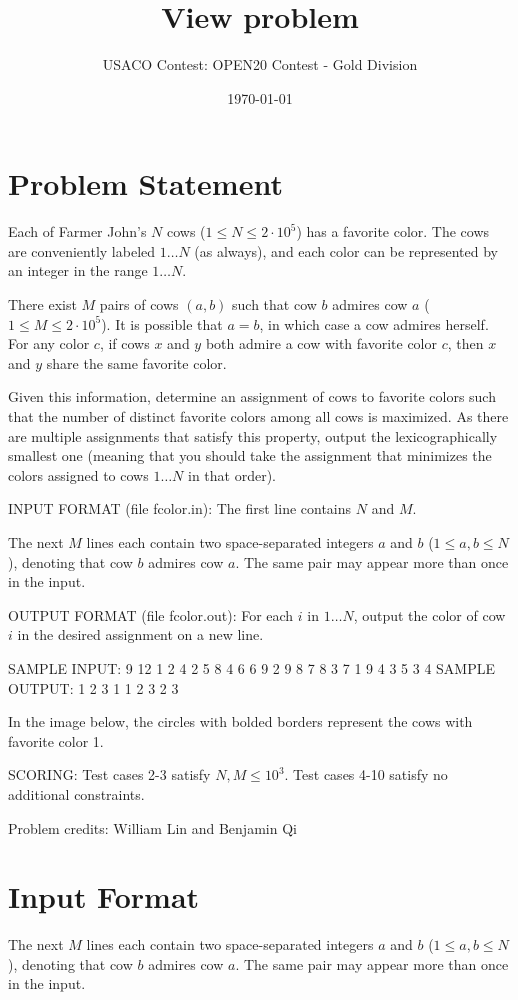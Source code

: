 \documentclass[12pt]{article}
\title{View problem}
\author{USACO Contest: OPEN20 Contest - Gold Division}
\date{\today}
\begin{document}
\maketitle

\section*{Problem Statement}

Each of Farmer John's $N$ cows ($1\le N\le 2\cdot 10^5$) has a favorite color.
The cows are conveniently labeled $1\ldots N$ (as always), and each color can be
represented by an integer in the range $1\ldots N$.

There exist $M$ pairs of cows $(a,b)$ such that cow
$b$ admires cow $a$ ($1\le M\le 2\cdot 10^5$). It is possible that $a=b$, in which case a cow admires
herself. For any color $c$, if cows $x$ and $y$ both admire a cow with favorite
color $c$, then $x$ and $y$ share the same favorite color.

Given this information, determine an assignment of cows to favorite colors such
that the number of distinct favorite colors among all cows is maximized.  As
there are multiple assignments that satisfy this property, output the
lexicographically smallest one (meaning that you should take the assignment that
minimizes the colors assigned to cows $1\ldots N$ in that order).

INPUT FORMAT (file fcolor.in):
The first line contains $N$ and $M$.

The next $M$ lines each contain two space-separated integers $a$ and $b$
($1\le a,b\le N$), denoting that cow $b$ admires cow $a$. The same pair may
appear more than once in the input.

OUTPUT FORMAT (file fcolor.out):
For each $i$ in $1\ldots N$, output the color of cow $i$ in the desired
assignment on a new line.

SAMPLE INPUT:
9 12
1 2
4 2
5 8
4 6
6 9
2 9
8 7
8 3
7 1
9 4
3 5
3 4
SAMPLE OUTPUT: 
1
2
3
1
1
2
3
2
3

In the image below, the circles with bolded borders represent the cows with 
favorite color 1.


SCORING:
Test cases 2-3 satisfy $N,M\le 10^3$. Test cases 4-10 satisfy no additional constraints. 


Problem credits: William Lin and Benjamin Qi



\section*{Input Format}
The next $M$ lines each contain two space-separated integers $a$ and $b$
($1\le a,b\le N$), denoting that cow $b$ admires cow $a$. The same pair may
appear more than once in the input.
\end{document}

